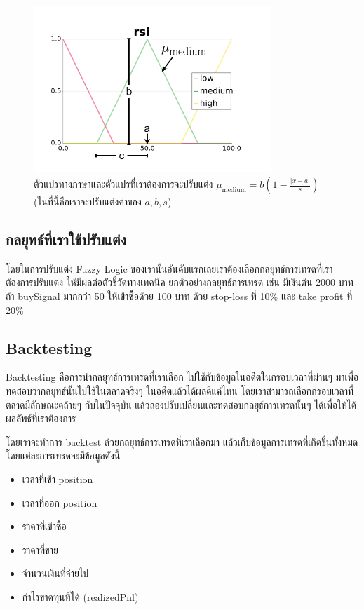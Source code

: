 \begin{figure}[ht]
    \centering
    \includegraphics[width=0.8\textwidth]{images/linguisticv.png}
    \caption{ตัวแปรทางภาษาและตัวแปรที่เราต้องการจะปรับแต่ง $\mu_{\text{medium}} = b (1 - \frac{ |x-a| }{s})$ (ในที่นี้คือเราจะปรับแต่งค่าของ $a, b, s$)}
    \label{fig:9}
\end{figure}

\subsection{กลยุทธ์ที่เราใช้ปรับแต่ง}
โดยในการปรับแต่ง Fuzzy Logic ของเรานั้นอันดับแรกเลยเราต้องเลือกกลยุทธ์การเทรดที่เราต้องการปรับแต่ง ให้มีผลต่อตัวชี้วัดทางเทคนิค ยกตัวอย่างกลยุทธ์การเทรด
เช่น มีเงินต้น 2000 บาท ถ้า buySignal มากกว่า 50 ให้เข้าซื้อด้วย 100 บาท ด้วย stop-loss ที่ 10\% และ take profit ที่ 20\%
\subsection{Backtesting}
Backtesting คือการนำกลยุทธ์การเทรดที่เราเลือก ไปใช้กับข้อมูลในอดีตในกรอบเวลาที่ผ่านๆ มาเพื่อทดสอบว่ากลยุทธ์นั้นไปใช้ในตลาดจริงๆ ในอดีตแล้วได้ผลดีแค่ไหน
โดยเราสามารถเลือกกรอบเวลาที่ตลาดมีลักษณะคล้ายๆ กับในปัจจุบัน แล้วลองปรับเปลี่ยนและทดสอบกลยุธ์การเทรดนั้นๆ ได้เพื่อให้ได้ผลลัพธ์ที่เราต้องการ

โดยเราจะทำการ backtest ด้วยกลยุทธ์การเทรดที่เราเลือกมา แล้วเก็บข้อมูลการเทรดที่เกิดขึ้นทั้งหมดโดยแต่ละการเทรดจะมีข้อมูลดังนี้
\begin{itemize}
    \item เวลาที่เข้า position
    \item เวลาที่ออก position
    \item ราคาที่เข้าซื้อ
    \item ราคาที่ขาย
    \item จำนวนเงินที่จ่ายไป
    \item กำไรขาดทุนที่ได้ ($\text{realizedPnl}$)
\end{itemize}

